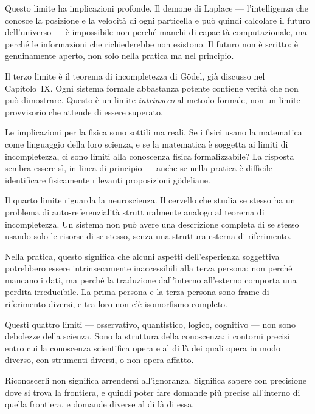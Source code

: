 \documentclass[12pt,a4paper,openany]{book}
\newcommand{\sezione}[1]{\vspace{1.2em}{\large\bfseries #1}\vspace{0.5em}\par}
\begin{document}
Questo limite ha implicazioni profonde. Il demone di Laplace --- l'intelligenza che conosce la posizione e la velocità di ogni particella e può quindi calcolare il futuro dell'universo --- è impossibile non perché manchi di capacità computazionale, ma perché le informazioni che richiederebbe non esistono. Il futuro non è scritto: è genuinamente aperto, non solo nella pratica ma nel principio.

\sezione{I limiti della logica: il teorema di incompletezza}

Il terzo limite è il teorema di incompletezza di Gödel, già discusso nel Capitolo~IX. Ogni sistema formale abbastanza potente contiene verità che non può dimostrare. Questo è un limite \textit{intrinseco} al metodo formale, non un limite provvisorio che attende di essere superato.

Le implicazioni per la fisica sono sottili ma reali. Se i fisici usano la matematica come linguaggio della loro scienza, e se la matematica è soggetta ai limiti di incompletezza, ci sono limiti alla conoscenza fisica formalizzabile? La risposta sembra essere sì, in linea di principio --- anche se nella pratica è difficile identificare fisicamente rilevanti proposizioni gödeliane.

\sezione{I limiti della neuroscienza: la cognizione che si auto-osserva}

Il quarto limite riguarda la neuroscienza. Il cervello che studia se stesso ha un problema di auto-referenzialità strutturalmente analogo al teorema di incompletezza. Un sistema non può avere una descrizione completa di se stesso usando solo le risorse di se stesso, senza una struttura esterna di riferimento.

Nella pratica, questo significa che alcuni aspetti dell'esperienza soggettiva potrebbero essere intrinsecamente inaccessibili alla terza persona: non perché mancano i dati, ma perché la traduzione dall'interno all'esterno comporta una perdita irreducibile. La prima persona e la terza persona sono frame di riferimento diversi, e tra loro non c'è isomorfismo completo.

\sezione{I limiti come struttura della conoscenza}

Questi quattro limiti --- osservativo, quantistico, logico, cognitivo --- non sono debolezze della scienza. Sono la struttura della conoscenza: i contorni precisi entro cui la conoscenza scientifica opera e al di là dei quali opera in modo diverso, con strumenti diversi, o non opera affatto.

Riconoscerli non significa arrendersi all'ignoranza. Significa sapere con precisione dove si trova la frontiera, e quindi poter fare domande più precise all'interno di quella frontiera, e domande diverse al di là di essa.
\end{document}
